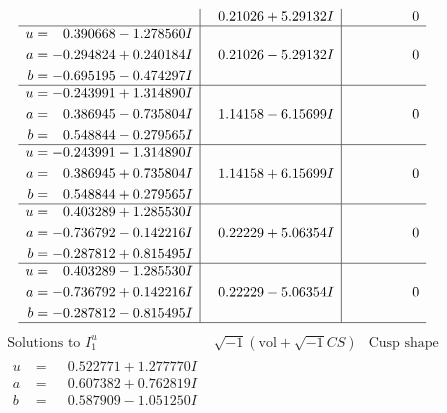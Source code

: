 \documentclass[1p]{elsarticle_modified}
\theoremstyle{definition}
\newcommand{\I}{\sqrt{-1}}
\begin{document}
$$\begin{array}{c|c|c}
 & \phantom{-}0.21026 + 5.29132 I & \phantom{-0.000000 } 0 \\ \hline\begin{aligned}
u &= \phantom{-}0.390668 - 1.278560 I \\
a &= -0.294824 + 0.240184 I \\
b &= -0.695195 - 0.474297 I\end{aligned}
 & \phantom{-}0.21026 - 5.29132 I & \phantom{-0.000000 } 0 \\ \hline\begin{aligned}
u &= -0.243991 + 1.314890 I \\
a &= \phantom{-}0.386945 - 0.735804 I \\
b &= \phantom{-}0.548844 - 0.279565 I\end{aligned}
 & \phantom{-}1.14158 - 6.15699 I & \phantom{-0.000000 } 0 \\ \hline\begin{aligned}
u &= -0.243991 - 1.314890 I \\
a &= \phantom{-}0.386945 + 0.735804 I \\
b &= \phantom{-}0.548844 + 0.279565 I\end{aligned}
 & \phantom{-}1.14158 + 6.15699 I & \phantom{-0.000000 } 0 \\ \hline\begin{aligned}
u &= \phantom{-}0.403289 + 1.285530 I \\
a &= -0.736792 - 0.142216 I \\
b &= -0.287812 + 0.815495 I\end{aligned}
 & \phantom{-}0.22229 + 5.06354 I & \phantom{-0.000000 } 0 \\ \hline\begin{aligned}
u &= \phantom{-}0.403289 - 1.285530 I \\
a &= -0.736792 + 0.142216 I \\
b &= -0.287812 - 0.815495 I\end{aligned}
 & \phantom{-}0.22229 - 5.06354 I & \phantom{-0.000000 } 0\\
 \hline 
 \end{array}$$\newpage$$\begin{array}{c|c|c}  
\text{Solutions to }I^u_{1}& \I (\text{vol} + \sqrt{-1}CS) & \text{Cusp shape}\\
 \hline 
\begin{aligned}
u &= \phantom{-}0.522771 + 1.277770 I \\
a &= \phantom{-}0.607382 + 0.762819 I \\
b &= \phantom{-}0.587909 - 1.051250 I\end{aligned}

\end{array}$$
\end{document}
